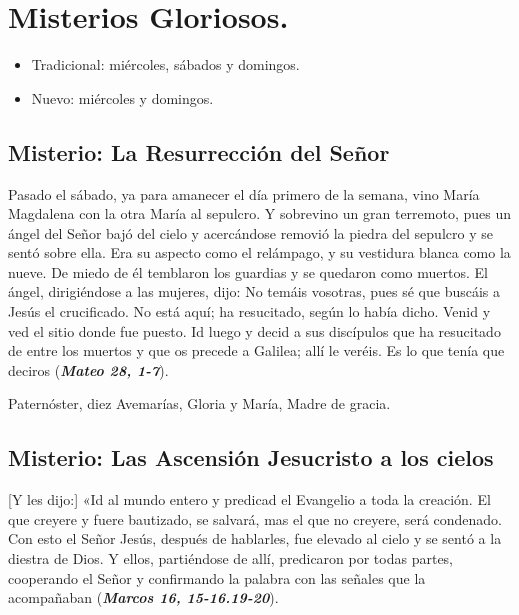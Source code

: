 \documentclass[./main.tex]{subfiles}
\newcounter{glorious-counter}
\begin{document}
\section*{Misterios Gloriosos.}
\begin{itemize}
      \item Tradicional: miércoles, sábados y domingos.
      \item Nuevo: miércoles y domingos.
\end{itemize}

\subsection*{ Misterio: La Resurrección del Señor}

Pasado el sábado, ya para amanecer el día primero de la semana, vino María Magdalena con la otra María al sepulcro. Y sobrevino un gran terremoto, 
pues un ángel del Señor bajó del cielo y acercándose removió la piedra del sepulcro y se sentó sobre ella. Era su aspecto como el relámpago, 
y su vestidura blanca como la nueve. De miedo de él temblaron los guardias y se quedaron como muertos. El ángel, dirigiéndose a las mujeres, dijo:
No temáis vosotras, pues sé que buscáis a Jesús el crucificado. No está aquí; ha resucitado, según lo había dicho. Venid y ved el sitio donde fue puesto.
Id luego y decid a sus discípulos que ha resucitado de entre los muertos y que os precede a Galilea; allí le veréis. Es lo que tenía que deciros (\textbf{\emph{Mateo 28, 1-7}}).

\begin{center}
      Paternóster, diez Avemarías, Gloria y María, Madre de gracia.
\end{center}

\subsection*{ Misterio: Las Ascensión Jesucristo a los cielos}

[Y les dijo:] «Id al mundo entero y predicad el Evangelio a toda la creación. El que creyere y fuere bautizado, se salvará, mas el que no creyere, será condenado. 
Con esto el Señor Jesús, después de hablarles, fue elevado al cielo y se sentó a la diestra de Dios. Y ellos, partiéndose de allí, predicaron por todas partes, 
cooperando el Señor y confirmando la palabra con las señales que la acompañaban (\textbf{\emph{Marcos 16, 15-16.19-20}}).
\end{document}
